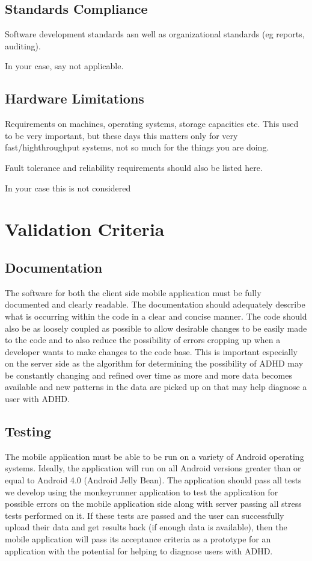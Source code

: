 \documentclass[a4wide]{article}
\begin{document}
\subsection{Standards Compliance}

Software development standards asn well as organizational standards
(eg reports, auditing).

In your case, say not applicable.

\subsection{Hardware Limitations}

Requirements on machines, operating systems, storage capacities etc.
This used to be very important, but these days this matters only
for very fast/highthroughput systems, not so much for the things you
are doing.

Fault tolerance and reliability requirements should also be listed here.

In your case this is not considered



\section{Validation Criteria}

\subsection{Documentation}
The software for both the client side mobile application must be fully documented and clearly readable. The documentation should adequately describe what is occurring within the code in a clear and concise manner. The code should also be as loosely coupled as possible to allow desirable changes to be easily made to the code and to also reduce the possibility of errors cropping up when a developer wants to make changes to the code base. This is important especially on the server side as the algorithm for determining the possibility of ADHD may be constantly changing and refined over time as more and more data becomes available and new patterns in the data are picked up on that may help diagnose a user with ADHD.
\subsection{Testing}
The mobile application must be able to be run on a variety of Android operating systems. Ideally, the application will run on all Android versions greater than or equal to Android 4.0 (Android Jelly Bean). The application should pass all tests we develop using the monkeyrunner application to test the application for possible errors on the mobile application side along with server passing all stress tests performed on it. If these tests are passed and the user can successfully upload their data and get results back (if enough data is available), then the mobile application will pass its acceptance criteria as a prototype for an application with the potential for helping to diagnose users with ADHD.
\end{document}

